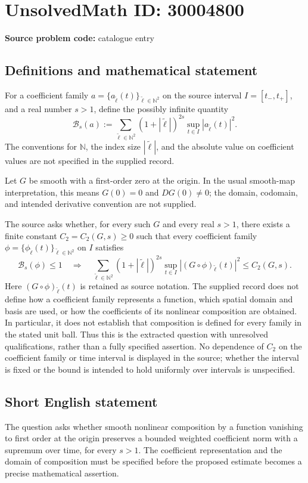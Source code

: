 \documentclass[11pt]{article}
\newcommand{\N}{\mathbb{N}}
\begin{document}
\section*{UnsolvedMath ID: 30004800}
\textbf{Source problem code:} catalogue entry
\subsection{Definitions and mathematical statement}
For a coefficient family \(a=\{a_{\widetilde{\ell}}(t)\}_{\widetilde{\ell}\in\N^2}\) on the source interval \(I=[t_-,t_+]\), and a real number \(s>1\), define the possibly infinite quantity
\[
\mathcal{B}_s(a):=\sum_{\widetilde{\ell}\in\N^2}(1+|\widetilde{\ell}|)^{2s}\sup_{t\in I}|a_{\widetilde{\ell}}(t)|^2.
\]
The conventions for \(\N\), the index size \(|\widetilde{\ell}|\), and the absolute value on coefficient values are not specified in the supplied record.

Let \(G\) be smooth with a first-order zero at the origin. In the usual smooth-map interpretation, this means \(G(0)=0\) and \(DG(0)\ne0\); the domain, codomain, and intended derivative convention are not supplied.

The source asks whether, for every such \(G\) and every real \(s>1\), there exists a finite constant \(C_2=C_2(G,s)\ge0\) such that every coefficient family \(\phi=\{\phi_{\widetilde{\ell}}(t)\}_{\widetilde{\ell}\in\N^2}\) on \(I\) satisfies
\[
\mathcal{B}_s(\phi)\le1
\quad\Longrightarrow\quad
\sum_{\widetilde{\ell}\in\N^2}(1+|\widetilde{\ell}|)^{2s}\sup_{t\in I}|(G\circ\phi)_{\widetilde{\ell}}(t)|^2\le C_2(G,s).
\]
Here \((G\circ\phi)_{\widetilde{\ell}}(t)\) is retained as source notation. The supplied record does not define how a coefficient family represents a function, which spatial domain and basis are used, or how the coefficients of its nonlinear composition are obtained. In particular, it does not establish that composition is defined for every family in the stated unit ball. Thus this is the extracted question with unresolved qualifications, rather than a fully specified assertion. No dependence of \(C_2\) on the coefficient family or time interval is displayed in the source; whether the interval is fixed or the bound is intended to hold uniformly over intervals is unspecified.
\subsection{Short English statement}
The question asks whether smooth nonlinear composition by a function vanishing to first order at the origin preserves a bounded weighted coefficient norm with a supremum over time, for every \(s>1\). The coefficient representation and the domain of composition must be specified before the proposed estimate becomes a precise mathematical assertion.
\end{document}
